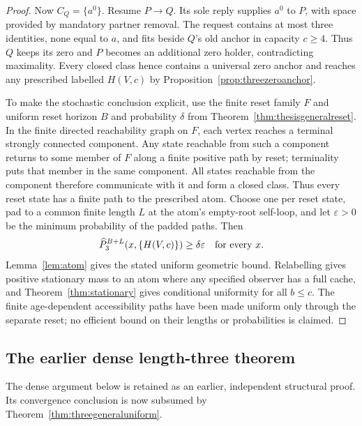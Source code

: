 \documentclass[11pt]{article}
\begin{document}
\begin{proof}
Now $C_Q=\{a^0\}$. Resume $P\to Q$. Its sole reply supplies
$a^0$ to $P$, with space provided by mandatory partner removal.
The request contains at most three identities, none equal to
$a$, and fits beside $Q$'s old anchor in capacity $c\ge4$.
Thus $Q$ keeps its zero and $P$ becomes an additional zero
holder, contradicting maximality. Every closed class hence
contains a universal zero anchor and reaches any prescribed
labelled $H(V,c)$ by Proposition~\ref{prop:threezeroanchor}.

To make the stochastic conclusion explicit, use the finite
reset family $F$ and uniform reset horizon $B$ and probability
$\delta$ from Theorem~\ref{thm:thesisgeneralreset}. In the
finite directed reachability graph on $F$, each vertex reaches
a terminal strongly connected component. Any state reachable
from such a component returns to some member of $F$ along a
finite positive path by reset; terminality puts that member
in the same component. All states reachable from the component
therefore communicate with it and form a closed class. Thus
every reset state has a finite path to the prescribed atom.
Choose one per reset state, pad to a common finite length $L$
at the atom's empty-root self-loop, and let $\varepsilon>0$
be the minimum probability of the padded paths. Then
\[
 \widehat P_3^{B+L}(x,\{H(V,c)\})\ge\delta\varepsilon
 \quad\hbox{for every }x.
\]
Lemma~\ref{lem:atom} gives the stated uniform geometric bound.
Relabelling gives positive stationary mass to an atom where
any specified observer has a full cache, and
Theorem~\ref{thm:stationary} gives conditional uniformity for
all $b\le c$. The finite age-dependent accessibility paths
have been made uniform only through the separate reset; no
efficient bound on their lengths or probabilities is claimed.
\end{proof}

\subsection{The earlier dense length-three theorem}

The dense argument below is retained as an earlier, independent
structural proof. Its convergence conclusion is now subsumed
by Theorem~\ref{thm:threegeneraluniform}.
\end{document}

